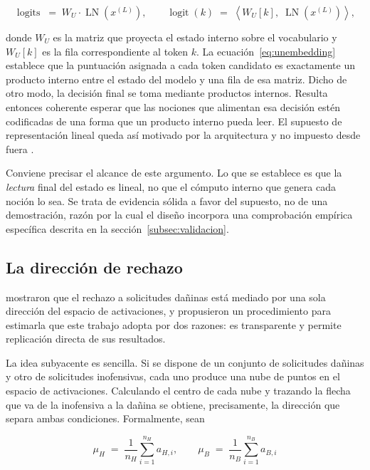 \begin{equation}
  \operatorname{logits} \;=\; W_U \cdot \operatorname{LN}\!\left(x^{(L)}\right),
  \qquad
  \operatorname{logit}(k) \;=\; \left\langle W_U[k],\; \operatorname{LN}\!\left(x^{(L)}\right)\right\rangle,
  \label{eq:unembedding}
\end{equation}

\noindent
donde $W_U$ es la matriz que proyecta el estado interno sobre el vocabulario y
$W_U[k]$ es la fila correspondiente al token $k$. La ecuación~\eqref{eq:unembedding}
establece que la puntuación asignada a cada token candidato es exactamente un
producto interno entre el estado del modelo y una fila de esa matriz. Dicho de
otro modo, la decisión final se toma mediante productos internos. Resulta
entonces coherente esperar que las nociones que alimentan esa decisión estén
codificadas de una forma que un producto interno pueda leer. El supuesto de
representación lineal queda así motivado por la arquitectura y no impuesto
desde fuera \parencite{elhage2021,zou2023}.

Conviene precisar el alcance de este argumento. Lo que se establece es que la
\textit{lectura} final del estado es lineal, no que el cómputo interno que
genera cada noción lo sea. Se trata de evidencia sólida a favor del supuesto,
no de una demostración, razón por la cual el diseño incorpora una comprobación
empírica específica descrita en la sección~\ref{subsec:validacion}.

\subsection{La dirección de rechazo}
\label{subsec:direccion}

\textcite{arditi2024} mostraron que el rechazo a solicitudes dañinas está
mediado por una sola dirección del espacio de activaciones, y propusieron un
procedimiento para estimarla que este trabajo adopta por dos razones: es
transparente y permite replicación directa de sus resultados.

La idea subyacente es sencilla. Si se dispone de un conjunto de solicitudes
dañinas y otro de solicitudes inofensivas, cada uno produce una nube de puntos
en el espacio de activaciones. Calculando el centro de cada nube y trazando la
flecha que va de la inofensiva a la dañina se obtiene, precisamente, la
dirección que separa ambas condiciones. Formalmente, sean

\begin{equation}
  \mu_H \;=\; \frac{1}{n_H}\sum_{i=1}^{n_H} a_{H,i},
  \qquad
  \mu_B \;=\; \frac{1}{n_B}\sum_{i=1}^{n_B} a_{B,i}
  \label{eq:centroides}
\end{equation}

